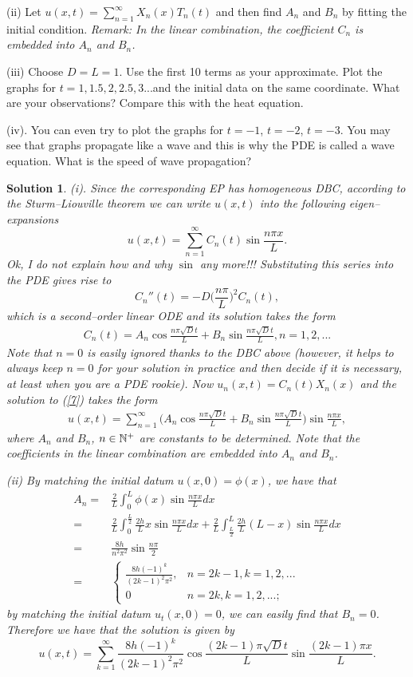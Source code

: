 \documentclass[6pt]{article}
\newtheorem{solution}{Solution}
\numberwithin{equation}{section}
\def\mathbb{\Bbb}
\begin{document}
\begin{enumerate}
(ii) Let $u(x,t)=\sum^\infty_{n=1}X_n(x)T_n(t)$ and then find $A_n$ and $B_n$ by fitting the initial condition.  \emph{Remark:  In the linear combination, the coefficient $C_n$ is embedded into $A_n$ and $B_n$.}

(iii)  Choose $D=L=1$.  Use the first 10 terms as your approximate.  Plot the graphs for $t=1, 1.5, 2, 2.5, 3$...and the initial data on the same coordinate.  What are your observations? Compare this with the heat equation.

(iv).  You can even try to plot the graphs for $t=-1$, $t=-2$, $t=-3$.  You may see that graphs propagate like a wave and this is why the PDE is called a wave equation.  What is the speed of wave propagation?
\begin{solution}
(i).  Since the corresponding EP has homogeneous DBC, according to the Sturm--Liouville theorem we can write $u(x,t)$ into the following eigen--expansions
\[u(x,t)=\sum_{n=1}^\infty C_n(t)\sin \frac{n\pi x}{L}.\]
Ok, I do not explain how and why $\sin$ any more!!! Substituting this series into the PDE gives rise to
\[C_n''(t)=-D\Big(\frac{n\pi}{L}\Big)^2C_n(t),\]
which is a second--order linear ODE and its solution takes the form
\begin{align*}
C_n(t)=A_n\cos{\frac{n\pi \sqrt{D} t}{L}}+B_n\sin{\frac{n\pi \sqrt{D} t}{L}}, n=1,2,...
\end{align*}
Note that $n=0$ is easily ignored thanks to the DBC above (however, it helps to always keep $n=0$ for your solution in practice and then decide if it is necessary, at least when you are a PDE rookie).   Now $u_n(x,t)=C_n(t) X_n(x)$ and the solution to (\ref{7}) takes the form
\begin{align*}
u(x,t)=\sum_{n=1}^{\infty} \Big(A_n\cos{\frac{n\pi \sqrt{D} t}{L}}+B_n\sin{\frac{n\pi \sqrt{D} t}{L}}\Big)\sin{\frac{n\pi x}{L}},
\end{align*}
where $A_n$ and $B_n$, $n\in\mathbb N^+$ are constants to be determined.   Note that the coefficients in the linear combination are embedded into $A_n$ and $B_n$.

(ii)  By matching the initial datum $u(x,0)=\phi(x)$, we have that
\begin{align*}
A_n=&\frac{2}{L}\int_{0}^{L} \phi(x)\sin{\frac{n\pi x}{L}}dx\\
=&\frac{2}{L}\int_{0}^{\frac{L}{2}}\frac{2h}{L}x\sin{\frac{n\pi x}{L}}dx+\frac{2}{L}\int^{L}_{\frac{L}{2}}\frac{2h}{L}(L-x)\sin{\frac{n\pi x}{L}}dx\\
=&\frac{8h}{n^2\pi^2}\sin{\frac{n\pi}{2}}\\
=&
\begin{cases}
\frac{8h(-1)^k}{(2k-1)^2\pi^2},&n=2k-1,k=1,2,...\\
0&n=2k,k=1,2,...;
\end{cases}
\end{align*}
by matching the initial datum $u_t(x,0)=0$, we can easily find that $B_n=0$.  Therefore we have that the solution is given by
\[u(x,t)=\sum_{k=1}^{\infty} \frac{8h(-1)^k}{(2k-1)^2\pi^2} \cos{\frac{(2k-1)\pi \sqrt{D} t}{L}}\sin{\frac{(2k-1)\pi x}{L}}.\]


\end{solution}
\end{enumerate}
\end{document}
